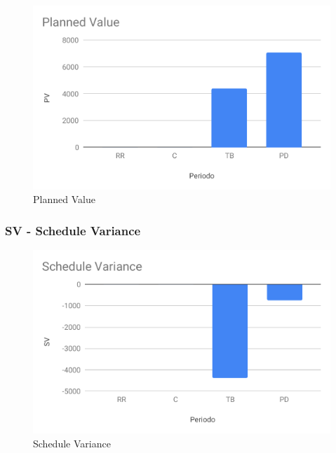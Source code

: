 \begin{figure}[H]
	\centering
	\includegraphics[scale=0.8]{res/images/RQ/pv.pdf}
	\caption{Planned Value}
\end{figure}

\subsubsection{SV - Schedule Variance}

\begin{figure}[H]
	\centering
	\includegraphics[scale=0.8]{res/images/RQ/sv.pdf}
	\caption{Schedule Variance}
\end{figure}

